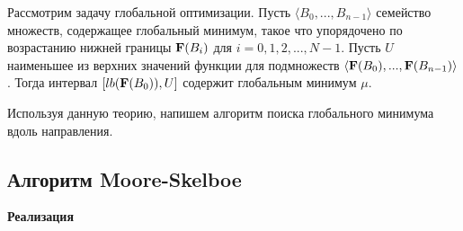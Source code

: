 \begin{theorem*}
Рассмотрим задачу глобальной оптимизации. Пусть $\langle B_0,..., B_{n-1} \rangle$ семейство множеств, содержащее глобальный минимум, такое что упорядочено по возрастанию нижней границы $\bold{F}(B_i)$ для $i=0, 1, 2,..., N-1$. Пусть $U$ наименьшее из верхних значений функции для подмножеств $\langle \bold{F}(B_0),..., \bold{F}(B_{n-1}) \rangle$. Тогда интервал $[lb(\bold{F}(B_0)), U]$ содержит глобальным минимум $\mu$.
\end{theorem*}

Используя данную теорию, напишем алгоритм поиска глобального минимума вдоль направления.

\subsection*{Алгоритм Moore-Skelboe}

\textbf{Реализация}\\

